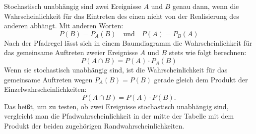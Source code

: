 \documentclass
[
  draft    = true,
  fontsize = 11pt,
  parskip  = half-,
  BCOR     = 0pt,
  DIV      = 11
]
{scrartcl}
\begin{document}
Stochastisch unabhängig sind zwei Ereignisse $A$ und $B$ genau dann, wenn
die Wahrscheinlichkeit für das Eintreten des einen nicht von der Realisierung
des anderen abhängt. Mit anderen Worten:
\begin{equation*}
  P(B)=P_{A}(B)\quad\text{und}\quad P(A)=P_{B}(A)
\end{equation*}
Nach der Pfadregel lässt sich in einem Baumdiagramm die Wahrscheinlichkeit für
das gemeinsame Auftreten zweier Ereignisse $A$ und $B$ stets wie folgt berechnen:
\begin{equation*}
  P(A\cap B)=P(A)\cdot P_{A}(B)
\end{equation*}
Wenn sie stochastisch unabhängig sind, ist die Wahrscheinlichkeit für das
gemeinsame Auftreten wegen $P_{A}(B)=P(B)$ gerade gleich dem Produkt der
Einzelwahrscheinlichkeiten:
\begin{equation*}
  P(A\cap B)=P(A)\cdot P(B).
\end{equation*}
Das heißt, um zu testen, ob zwei Ereignisse stochastisch unabhängig sind,
vergleicht man die Pfadwahrscheinlichkeit in der mitte der Tabelle mit dem
Produkt der beiden zugehörigen Randwahrscheinlichkeiten.

\end{document}
